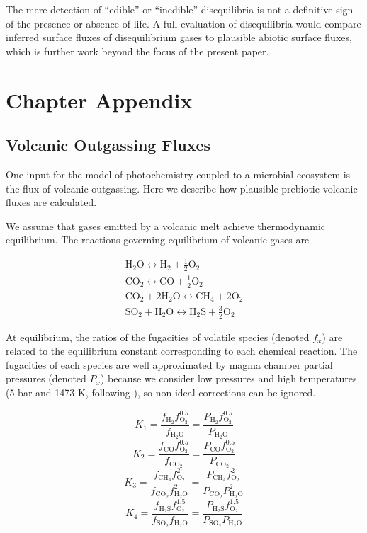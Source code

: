 The mere detection of ``edible'' or ``inedible'' disequilibria is not a definitive sign of the presence or absence of life.  A full evaluation of disequilibria would compare inferred surface fluxes of disequilibrium gases to plausible abiotic surface fluxes, which is further work beyond the focus of the present paper.

\section{Chapter Appendix}

\subsection{Volcanic Outgassing Fluxes}

One input for the model of photochemistry coupled to a microbial ecosystem is the flux of volcanic outgassing. Here we describe how plausible prebiotic volcanic fluxes are calculated. 

We assume that gases emitted by a volcanic melt achieve thermodynamic equilibrium. The reactions governing equilibrium of volcanic gases are

\begin{gather}
  \mathrm{H_2O} \leftrightarrow \mathrm{H_2} + \frac{1}{2} \mathrm{O_2} \\
  \mathrm{CO_2} \leftrightarrow \mathrm{CO} + \frac{1}{2} \mathrm{O_2} \\
  \mathrm{CO_2} + 2 \mathrm{H_2O} \leftrightarrow \mathrm{CH_4} + 2 \mathrm{O_2} \\
  \mathrm{SO_2} + \mathrm{H_2O} \leftrightarrow \mathrm{H_2S} + \frac{3}{2} \mathrm{O_2}
\end{gather}

At equilibrium, the ratios of the fugacities of volatile species (denoted $f_x$) are related to the equilibrium constant corresponding to each chemical reaction. The fugacities of each species are well approximated by magma chamber partial pressures (denoted $P_x$) because we consider low pressures and high temperatures (5 bar and 1473 K, following \citet{Holland_1984}), so non-ideal corrections can be ignored. 

\begin{equation}
  \label{eq:K_1_equilibrium}
  K_1 = \frac{f_\mathrm{H_2} f_\mathrm{O_2}^{0.5}}{f_\mathrm{H_2O}} = \frac{P_\mathrm{H_2} f_\mathrm{O_2}^{0.5}}{P_\mathrm{H_2O}}
\end{equation}
\begin{equation}
  K_2 = \frac{f_\mathrm{CO} f_\mathrm{O_2}^{0.5}}{f_\mathrm{CO_2}} = \frac{P_\mathrm{CO} f_\mathrm{O_2}^{0.5}}{P_\mathrm{CO_2}}
\end{equation}
\begin{equation}
  K_3 = \frac{f_\mathrm{CH_4} f_\mathrm{O_2}^{2}}{f_\mathrm{CO_2} f_\mathrm{H_2O}^2} = \frac{P_\mathrm{CH_4} f_\mathrm{O_2}^{2}}{P_\mathrm{CO_2} P_\mathrm{H_2O}^2} 
\end{equation}
\begin{equation}
  K_4 = \frac{f_\mathrm{H_2S} f_\mathrm{O_2}^{1.5}}{f_\mathrm{SO_2} f_\mathrm{H_2O}} = \frac{P_\mathrm{H_2S} f_\mathrm{O_2}^{1.5}}{P_\mathrm{SO_2} P_\mathrm{H_2O}} 
\end{equation}

